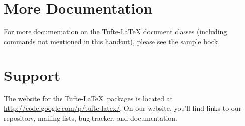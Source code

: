 \documentclass{tufte-handout}
\begin{document}



\section{More Documentation}\label{sec:more-doc}
For more documentation on the Tufte-\LaTeX{} document classes (including commands not
mentioned in this handout), please see the sample book.

\section{Support}\label{sec:support}

The website for the Tufte-\LaTeX\ packages is located at
\url{http://code.google.com/p/tufte-latex/}.  On our website, you'll find
links to our  repository, mailing lists, bug tracker, and documentation.



\end{document}
